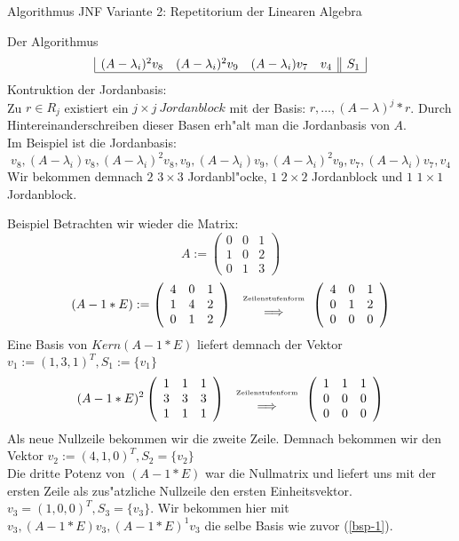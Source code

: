 \documentclass[a4paper]{article}
\begin{document}
\begin{section}{Algorithmus JNF Variante 2: Repetitorium der Linearen Algebra}
\begin{subsection}{Der Algorithmus}
$$\begin{array}{|cccc||c|}
(A-\lambda_i)^2 v_8 & (A-\lambda_i)^2 v_9 & (A-\lambda_i) v_7 & v_4 & S_1 \\\hline 
\end{array}
$$
Kontruktion der Jordanbasis:\\
Zu $r \in R_j$ existiert ein $j \times j \ Jordanblock$ mit der Basis: $r,\ldots, (A-\lambda)^j*r$. Durch Hintereinanderschreiben dieser Basen erh"alt man die Jordanbasis von $A$. \\
Im Beispiel ist die Jordanbasis:
$$v_8, (A-\lambda_i)v_8, (A-\lambda_i)^2v_8, v_9, (A-\lambda_i)v_9, (A-\lambda_i)^2v_9, v_7, (A-\lambda_i) v_7, v_4$$
Wir bekommen demnach $2$ $3\times3$ Jordanbl"ocke, $1$ $2\times2$ Jordanblock und $1$ $1\times1$ Jordanblock. 
\end{subsection}
\begin{subsection}{Beispiel}
Betrachten wir wieder die Matrix:
$$A:=\left ( \begin{array}{ccc}
0 & 0 & 1 \\
1 & 0 & 2 \\
0 & 1 & 3
\end{array}\right )$$
$$(A-1 * E):= \left ( \begin{array}{ccc}
4 & 0 & 1\\
1 & 4 & 2 \\
0 & 1 & 2
\end{array} \right ) \ \begin{array}{c}\mbox{\tiny Zeilenstufenform} \\ \Longrightarrow \end{array}
\left ( \begin{array}{ccc}
4 & 0 & 1 \\
0 & 1 & 2 \\
0 & 0 & 0
\end{array} \right )$$
Eine Basis von $Kern(A-1*E)$ liefert demnach der Vektor $v_1:=(1,3,1)^T, S_1:=\{v_1\}$
$$(A-1*E)^2 \left ( \begin{array}{ccc}
1 & 1 & 1 \\
3 & 3 & 3 \\
1 & 1 & 1
\end{array} \right ) \ \begin{array}{c}\mbox{\tiny Zeilenstufenform} \\ \Longrightarrow \end{array}
\left ( \begin{array}{ccc}
1 & 1 & 1 \\
0 & 0 & 0 \\
0 & 0 & 0
\end{array} \right )$$
Als neue Nullzeile bekommen wir die zweite Zeile. Demnach bekommen wir den Vektor $v_2:=(4,1,0)^T, S_2=\{v_2\}$\\
Die dritte Potenz von $(A-1*E)$ war die Nullmatrix und liefert uns mit der ersten Zeile als zus"atzliche Nullzeile den ersten Einheitsvektor. $v_3 = (1,0,0)^T, S_3=\{v_3\}$. Wir bekommen hier mit $v_3, (A-1*E) v_3, (A-1*E)^1 v_3$ die selbe Basis wie zuvor (\ref{bsp-1}).
\end{subsection}
\end{section}
\end{document}
